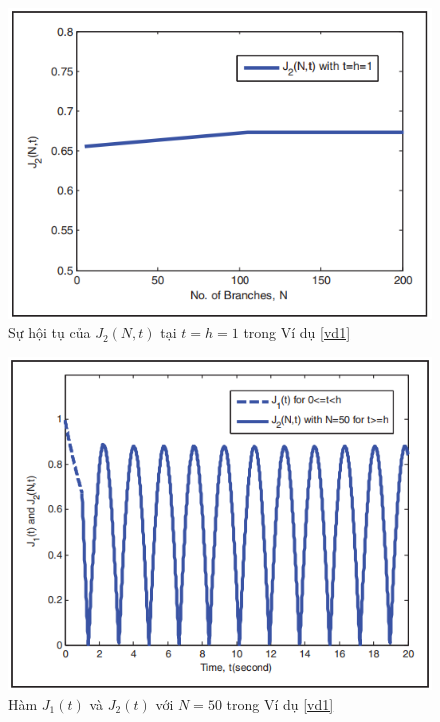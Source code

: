 \begin{vd}
\begin{figure}[h!]
	\centering
	\includegraphics[scale= 0.7]{"./Hinh/Hinh12"}
	\caption[Sự hội tụ của $J_2(N,t)$ tại $t = h = 1$ trong Ví dụ \ref{vd1}]{Sự hội tụ của $J_2(N,t)$ tại $t = h = 1$ trong Ví dụ \ref{vd1}}
	\label{fig:hinh-12}
\end{figure}
\begin{figure}[h!]
	\centering
	\includegraphics[scale= 0.7]{"./Hinh/Hinh13"}
	\caption[Hàm $J_1(t)$ và $J_2(t)$ với $N = 50$ trong Ví dụ \ref{vd1} ]{Hàm $J_1(t)$ và $J_2(t)$ với $N = 50$ trong Ví dụ \ref{vd1}}
	\label{fig:hinh-13}
\end{figure}
\begin{figure}[h!]
	\centering

\end{figure}
\end{vd}
